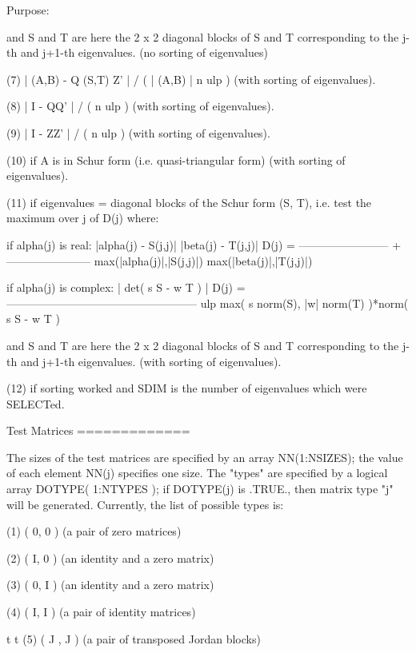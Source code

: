 \begin{DoxyParagraph}{Purpose\+: }
\begin{DoxyVerb}
       and S and T are here the 2 x 2 diagonal blocks of S and T
       corresponding to the j-th and j+1-th eigenvalues.
       (no sorting of eigenvalues)

 (7)   | (A,B) - Q (S,T) Z' | / ( | (A,B) | n ulp )
            (with sorting of eigenvalues).

 (8)   | I - QQ' | / ( n ulp ) (with sorting of eigenvalues).

 (9)   | I - ZZ' | / ( n ulp ) (with sorting of eigenvalues).

 (10)  if A is in Schur form (i.e. quasi-triangular form)
       (with sorting of eigenvalues).

 (11)  if eigenvalues = diagonal blocks of the Schur form (S, T),
       i.e. test the maximum over j of D(j)  where:

       if alpha(j) is real:
                     |alpha(j) - S(j,j)|        |beta(j) - T(j,j)|
           D(j) = ------------------------ + -----------------------
                  max(|alpha(j)|,|S(j,j)|)   max(|beta(j)|,|T(j,j)|)

       if alpha(j) is complex:
                                 | det( s S - w T ) |
           D(j) = ---------------------------------------------------
                  ulp max( s norm(S), |w| norm(T) )*norm( s S - w T )

       and S and T are here the 2 x 2 diagonal blocks of S and T
       corresponding to the j-th and j+1-th eigenvalues.
       (with sorting of eigenvalues).

 (12)  if sorting worked and SDIM is the number of eigenvalues
       which were SELECTed.

 Test Matrices
 =============

 The sizes of the test matrices are specified by an array
 NN(1:NSIZES); the value of each element NN(j) specifies one size.
 The "types" are specified by a logical array DOTYPE( 1:NTYPES ); if
 DOTYPE(j) is .TRUE., then matrix type "j" will be generated.
 Currently, the list of possible types is:

 (1)  ( 0, 0 )         (a pair of zero matrices)

 (2)  ( I, 0 )         (an identity and a zero matrix)

 (3)  ( 0, I )         (an identity and a zero matrix)

 (4)  ( I, I )         (a pair of identity matrices)

         t   t
 (5)  ( J , J  )       (a pair of transposed Jordan blocks)


\end{DoxyVerb}
\end{DoxyParagraph}
